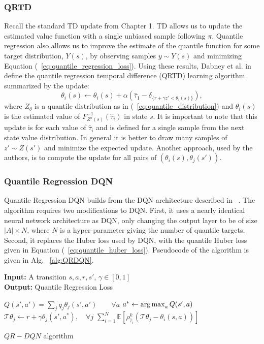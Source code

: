 \subsubsection{QRTD}
Recall the standard TD update from Chapter 1. TD allows us to update the estimated value function with a single unbiased sample following $\pi$. Quantile regression also allows us to improve the estimate of the quantile function for some target distribution, $Y(s)$, by observing samples $y \sim Y(s)$ and minimizing Equation (~\ref{eq:quantile_regression_loss}). Using these results, Dabney et al. in ~\cite{DBLP:journals/corr/abs-1710-10044} define the quantile regression temporal difference (QRTD) learning algorithm summarized by the update: 
\begin{equation}
\theta_i(s) \leftarrow \theta_i(s)+ \alpha(\hat{\tau}_1- \delta_{\lbrace r+\gamma z' < \theta_i(s) \rbrace}),
\end{equation}
where $Z_\theta$ is a quantile distribution as in (~\ref{eq:quantile_distribution}) and $\theta_i(s)$ is the estimated value of $F^{-1}_{Z^{\pi}(s)}(\hat{\tau}_i)$ in state $s$. It is important to note that this update is for each value of $\hat{\tau}_i$ and is defined for a single sample from the next state value distribution. In general it is better to draw many samples of $z′\sim Z(s′)$ and minimize the expected update. Another approach, used by the authors, is to compute the update for all pairs of $(\theta_i(s),\theta_j(s′))$.
\subsubsection{Quantile Regression DQN}
Quantile Regression DQN builds from the DQN architecture described in ~\cite{mnih2015humanlevel}. The algorithm requires two modifications to DQN. First, it uses a nearly identical neural network architecture as DQN, only changing the output layer to be of size $\vert A \vert \times N$, where $N$ is a hyper-parameter giving the number of quantile targets. Second, it replaces the Huber loss used by DQN,  with the quantile Huber loss given in Equation (~\ref{eq:quantile_huber_loss}). Pseudocode of the algorithm is given in Alg. ~\ref{alg:QRDQN}.
\begin{algorithm}[H]
\begin{flushleft}
 \textbf{Input:} A transition $s,a,r,s'$, $\gamma \in [0,1]$\\
 \textbf{Output:} Quantile Regression Loss
\end{flushleft}
 \begin{algorithmic}
 \State $Q(s',a')= \sum_{j} q_j \theta_j(s',a')	\qquad \forall a$
 \State $a^* \leftarrow \operatorname*{arg\,max}_a Q(s',a)$
 \State $\mathcal{T}\theta_j \leftarrow r+ \gamma \theta_j(s',a^*), \quad \forall j$
 \State \Return $\sum_{i=1}^{N} \mathbb{E} \left[ \rho^k_{\hat{\tau}_i}(\mathcal{T}\theta_j - \theta_i(s,a)) \right]$
 \end{algorithmic}
 \caption{$QR-DQN$ algorithm}
 \label{alg:QRDQN}
\end{algorithm}